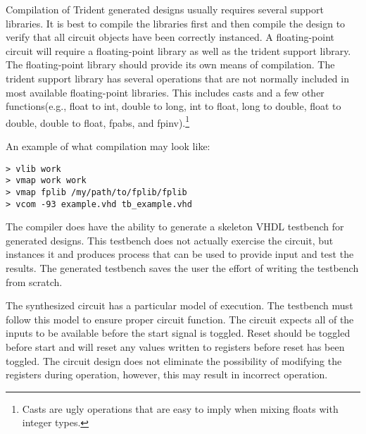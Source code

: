 %

Compilation of Trident generated designs usually requires several
support libraries.  It is best to compile the libraries first and then
compile the design to verify that all circuit objects have been
correctly instanced.  A floating-point circuit will require a
floating-point library as well as the trident support library.  The
floating-point library should provide its own means of compilation.
The trident support library has several operations that are not
normally included in most available floating-point libraries.  This
includes casts and a few other functions(e.g., float to int, double to
long, int to float, long to double, float to double, double to float,
fpabs, and fpinv).\footnote{Casts are ugly operations that are easy to
  imply when mixing floats with integer types.}

An example of what compilation may look like:

\begin{verbatim}
> vlib work
> vmap work work
> vmap fplib /my/path/to/fplib/fplib
> vcom -93 example.vhd tb_example.vhd
\end{verbatim}

%

The compiler does have the ability to generate a skeleton VHDL
testbench for generated designs.  This testbench does not actually
exercise the circuit, but instances it and produces process that
can be used to provide input and test the results.  The generated
testbench saves the user the effort of writing the testbench from
scratch.

%
The synthesized circuit has a particular model of execution.  The
testbench must follow this model to ensure proper circuit function.
The circuit expects all of the inputs to be available before the start
signal is toggled.  Reset should be toggled before start and will
reset any values written to registers before reset has been toggled.
The circuit design does not eliminate the possibility of modifying the
registers during operation, however, this may result in incorrect
operation.


